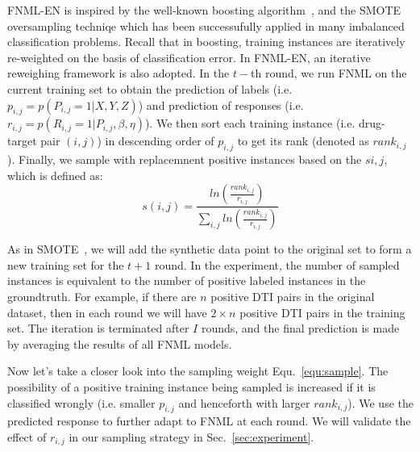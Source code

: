 \documentclass[conference]{IEEEtran}
\begin{document}
FNML-EN is inspired by the well-known boosting algorithm~\cite{boosting}, and the SMOTE~\cite{} oversampling techniqe which has been successufully applied in many imbalanced classification problems. Recall that in boosting, training instances are iteratively re-weighted on the basis of classification error. In FNML-EN, an iterative reweighing framework is also adopted. In the $t-$th round, we run FNML on the current training set to obtain the prediction of labels (i.e. $p_{i,j}=p(P_{i,j}=1|X,Y,Z)$) and prediction of responses (i.e. $r_{i,j}=p(R_{i,j}=1|P_{i,j},\beta,\eta)$). We then sort each training instance (i.e. drug-target pair $(i,j)$) in descending order of $p_{i,j}$ to get its rank (denoted as $rank_{i,j}$). Finally, we sample with replacemnent positive instances based on the $s{i,j}$, which is defined as:
\begin{equation}\label{equ:sample}
    s(i,j) = \frac{ln(\frac{rank_{i,j}}{r_{i,j}})}{\sum_{i,j}{ln(\frac{rank_{i,j}}{r_{i,j}})}}
\end{equation}

As in SMOTE~\cite{}, we will add the synthetic data point to the original set to form a new training set for the $t+1$ round. In the experiment, the number of sampled instances is equivalent to the number of positive labeled instances in the groundtruth. For example, if there are $n$ positive DTI pairs in the original dataset, then in each round we will have $2\times n$ positive DTI pairs in the training set. The iteration is terminated after $I$ rounds, and the final prediction is made by averaging the results of all FNML models. 

Now let's take a closer look into the sampling weight Equ.~\ref{equ:sample}. The possibility of a positive training instance being sampled is increased if it is classified wrongly (i.e. smaller $p_{i,j}$ and henceforth with larger $rank_{i,j}$). We use the predicted response to further adapt to FNML at each round. We will validate the effect of $r_{i,j}$ in our sampling strategy in Sec.~\ref{sec:experiment}. 



%
\end{document}
